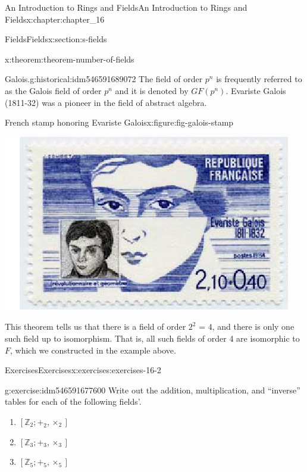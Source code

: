 \documentclass[oneside,10pt,]{book}
\numberwithin{equation}{section}
\begin{document}
\begin{chapterptx}{An Introduction to Rings and Fields}{}{An Introduction to Rings and Fields}{}{}{x:chapter:chapter_16}
\begin{sectionptx}{Fields}{}{Fields}{}{}{x:section:s-fields}
\begin{theorem}{}{}{x:theorem:theorem-number-of-fields}
%
\end{theorem}
\begin{historical}{Galois.}{g:historical:idm546591689072}%
The field of order \(p^n\) is frequently referred to as the Galois field of order \(p^n\) and it is denoted by  \(GF(p^n)\).  Evariste Galois (1811-32) was a pioneer in the field of abstract algebra.%
\end{historical}
\begin{figureptx}{French stamp honoring Evariste Galois}{x:figure:fig-galois-stamp}{}%
\begin{image}{0.2}{0.6}{0.2}%
\includegraphics[width=\linewidth]{images/fig-galois-stamp.png}
\end{image}%
\tcblower
\end{figureptx}%
This theorem tells us  that there is a field of order \(2^2\textrm{ = 4}\), and there is only one such field up to isomorphism.   That is, all such fields of order 4 are isomorphic to \(F\), which we constructed in the example above.%
%
%
\typeout{************************************************}
\typeout{************************************************}
%
\begin{exercises-subsection}{Exercises}{}{Exercises}{}{}{x:exercises:exercises-16-2}
\begin{divisionexercise}{1}{}{}{g:exercise:idm546591677600}%
Write out the addition, multiplication, and ``inverse'' tables for each of the following fields'.%
\begin{enumerate}[label=(\alph*)]
\item{}\(\left[\mathbb{Z}_2; +_2, \times _2\right]\)%
\item{}\(\left[\mathbb{Z}_3; +_3, \times _3\right]\)%
\item{}\(\left[\mathbb{Z}_5; +_5, \times _5\right]\)%

\end{enumerate}
\end{divisionexercise}
\end{exercises-subsection}
\end{sectionptx}
\end{chapterptx}
\end{document}
